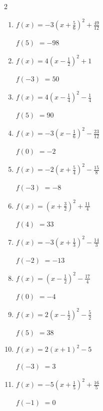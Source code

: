 \begin{multicols}{2}
\begin{enumerate}
$f(-4)$
        $=-71$

  \item $\displaystyle f(x)=-3\left( x+\frac{5}{6}\right)^{2}+\frac{49}{12}$

$f(5)$
        $=-98$

  \item $\displaystyle f(x)=4\left( x-\frac{1}{2}\right)^{2}+1$

$f(-3)$
        $=50$

\columnbreak %

\resetques

  \item $\displaystyle f(x)=4\left( x-\frac{1}{4}\right)^{2}-\frac{1}{4}$

$f(5)$
        $=90$

  \item $\displaystyle f(x)=-3\left( x-\frac{1}{6}\right)^{2}-\frac{23}{12}$

$f(0)$
        $=-2$

  \item $\displaystyle f(x)=-2\left( x+\frac{5}{4}\right)^{2}-\frac{15}{8}$

$f(-3)$
        $=-8$

  \item $\displaystyle f(x)=\left( x+\frac{3}{2}\right)^{2}+\frac{11}{4}$

$f(4)$
        $=33$

  \item $\displaystyle f(x)=-3\left( x+\frac{1}{3}\right)^{2}-\frac{14}{3}$

$f(-2)$
        $=-13$

\columnbreak %

  \item $\displaystyle f(x)=\left( x-\frac{1}{2}\right)^{2}-\frac{17}{4}$

$f(0)$
        $=-4$

  \item $\displaystyle f(x)=2\left( x-\frac{1}{2}\right)^{2}-\frac{5}{2}$

$f(5)$
        $=38$

  \item $\displaystyle f(x)=2\left( x+1\right)^{2}-5$

$f(-3)$
        $=3$

  \item $\displaystyle f(x)=-5\left( x+\frac{1}{5}\right)^{2}+\frac{16}{5}$

$f(-1)$
        $=0$


\end{enumerate}
\end{multicols}
